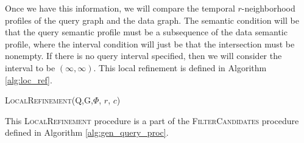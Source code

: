 Once we have this information, we will compare the temporal $r$-neighborhood
profiles of the query graph and the data graph. The semantic condition will be
that the query semantic profile must be a subsequence of the data semantic
profile, where the interval condition will just be that the intersection must be
nonempty.  If there is no query interval specified, then we will consider the
interval to be $(\infty, \infty)$. This local refinement is defined in Algorithm
\ref{alg:loc_ref}.

\begin{algorithm}
  \label{alg:loc_ref}
  \caption{\textsc{LocalRefinement(Q,G,$\Phi$, $r$, $c$)}}
  \SetAlgoLined

\end{algorithm}


This \textsc{LocalRefinement} procedure is a part of the
\textsc{FilterCandidates} procedure defined in Algorithm
\ref{alg:gen_query_proc}.


